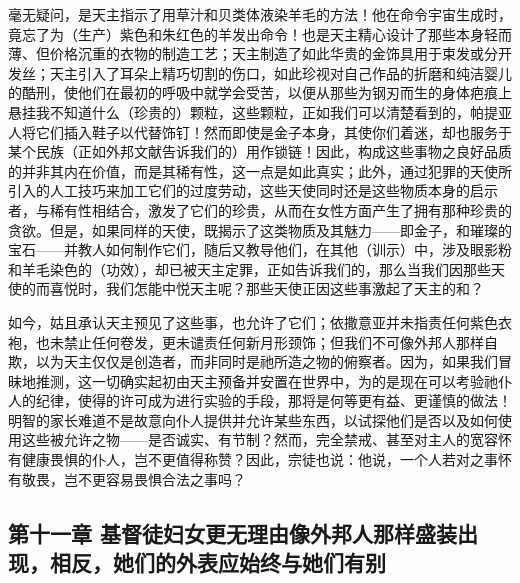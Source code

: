 毫无疑问，是天主指示了用草汁和贝类体液染羊毛的方法！他在命令宇宙生成时，竟忘了为（生产）紫色和朱红色的羊发出命令！也是天主精心设计了那些本身轻而薄、但价格沉重的衣物的制造工艺；天主制造了如此华贵的金饰具用于束发或分开发丝；天主引入了耳朵上精巧切割的伤口，如此珍视对自己作品的折磨和纯洁婴儿的酷刑，使他们在最初的呼吸中就学会受苦，以便从那些为钢刃而生的身体疤痕上悬挂我不知道什么（珍贵的）颗粒，这些颗粒，正如我们可以清楚看到的，帕提亚人将它们插入鞋子以代替饰钉！然而即使是金子本身，其使你们着迷，却也服务于某个民族（正如外邦文献告诉我们的）用作锁链！因此，构成这些事物之良好品质的并非其内在价值，而是其稀有性，这一点是如此真实；此外，通过犯罪的天使所引入的人工技巧来加工它们的过度劳动，这些天使同时还是这些物质本身的启示者，与稀有性相结合，激发了它们的珍贵，从而在女性方面产生了拥有那种珍贵的贪欲。但是，如果同样的天使，既揭示了这类物质及其魅力——即金子，和璀璨的宝石——并教人如何制作它们，随后又教导他们，在其他（训示）中，涉及眼影粉和羊毛染色的（功效），却已被天主定罪，正如告诉我们的，那么当我们因那些天使的而喜悦时，我们怎能中悦天主呢？那些天使正因这些事激起了天主的和？\par

如今，姑且承认天主预见了这些事，也允许了它们；依撒意亚并未指责任何紫色衣袍，也未禁止任何卷发，更未谴责任何新月形颈饰；但我们不可像外邦人那样自欺，以为天主仅仅是创造者，而非同时是祂所造之物的俯察者。因为，如果我们冒昧地推测，这一切确实起初由天主预备并安置在世界中，为的是现在可以考验祂仆人的纪律，使得的许可成为进行实验的手段，那将是何等更有益、更谨慎的做法！明智的家长难道不是故意向仆人提供并允许某些东西，以试探他们是否以及如何使用这些被允许之物——是否诚实、有节制？然而，完全禁戒、甚至对主人的宽容怀有健康畏惧的仆人，岂不更值得称赞？因此，宗徒也说：他说，一个人若对之事怀有敬畏，岂不更容易畏惧合法之事吗？\par


\subsection{第十一章 基督徒妇女更无理由像外邦人那样盛装出现，相反，她们的外表应始终与她们有别}

